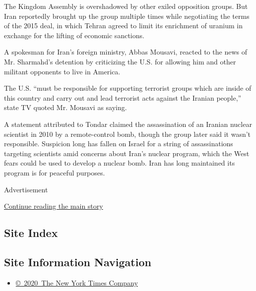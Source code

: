 The Kingdom Assembly is overshadowed by other exiled opposition groups.
But Iran reportedly brought up the group multiple times while
negotiating the terms of the 2015 deal, in which Tehran agreed to limit
its enrichment of uranium in exchange for the lifting of economic
sanctions.

A spokesman for Iran's foreign ministry, Abbas Mousavi, reacted to the
news of Mr. Sharmahd's detention by criticizing the U.S. for allowing
him and other militant opponents to live in America.

The U.S. ``must be responsible for supporting terrorist groups which are
inside of this country and carry out and lead terrorist acts against the
Iranian people,'' state TV quoted Mr. Mousavi as saying.

A statement attributed to Tondar claimed the assassination of an Iranian
nuclear scientist in 2010 by a remote-control bomb, though the group
later said it wasn't responsible. Suspicion long has fallen on Israel
for a string of assassinations targeting scientists amid concerns about
Iran's nuclear program, which the West fears could be used to develop a
nuclear bomb. Iran has long maintained its program is for peaceful
purposes.

Advertisement

\protect\hyperlink{after-bottom}{Continue reading the main story}

\hypertarget{site-index}{%
\subsection{Site Index}\label{site-index}}

\hypertarget{site-information-navigation}{%
\subsection{Site Information
Navigation}\label{site-information-navigation}}

\begin{itemize}
\tightlist
\item
  \href{https://help.nytimes.com/hc/en-us/articles/115014792127-Copyright-notice}{©~2020~The
  New York Times Company}
\end{itemize}

